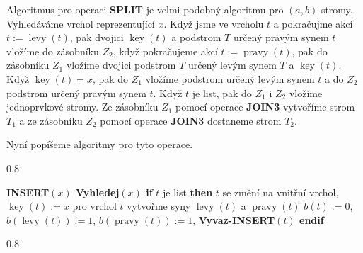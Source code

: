 \documentclass[a4paper,12pt]{article}
\DeclareMathOperator*{\levy}{levy}
\DeclareMathOperator*{\pravy}{pravy}
\DeclareMathOperator*{\key}{key}
\newcommand{\algoritmus}[1]{
  {
  \setlength\fboxrule{0.5pt}

  \begin{boxedminipage}{0.8\textwidth}

 #1
  \end{boxedminipage}

  }
  }
\begin{document}
Algoritmus pro operaci {\bf SPLIT} je velmi podobný 
algoritmu pro $(a,b)$-stromy. Vy\-hledává\-me vrchol 
reprezentující $x$. Když jsme ve vrcholu $t$ a pokračujme akcí 
$t:=\levy(t)$, pak dvojici $\key(t)$ a podstrom $T$ určený pravým 
synem $t$ vložíme do zásobníku $Z_2$, když pokračujeme akcí 
$t:=\pravy(t)$, pak do zásobníku $Z_1$ vložíme dvojici podstrom $
T$ 
určený levým synem $T$ a $\key(t)$. Když $\key(t)=x$, pak do $
Z_1$ 
vložíme podstrom určený levým synem $t$ a do $Z_2$ podstrom 
určený pravým synem $t$. Když $t$ je list, pak do $Z_1$ i $
Z_2$ vložíme 
jednoprvkové stromy. Ze zásobníku $Z_1$ pomocí operace {\bf JOIN3 }
vytvoříme strom $T_1$ a ze zásobníku $Z_2$ pomocí operace {\bf JOIN3 }
dostaneme strom $T_2$. 

Nyní popíšeme algoritmy pro tyto operace.

\algoritmus{{\bf INSERT$(x)$\newline 
Vyhledej$(x)$\newline 
if} $t$ je list {\bf then}\newline 
\phantom{---}$t$ se změní na vnitřní vrchol, $\key(t):=x$\newline 
\phantom{---}pro vrchol $t$ vytvořme syny $\levy(t)$ a $\pravy(t)$\newline 
\phantom{---}$b(t):=0$, $b(\levy(t)):=1$, $b(\pravy(t)):=1$, {\bf Vyvaz-INSERT$(t)$\newline
endif
}}\algoritmus{{\bf

}}
\end{document}
